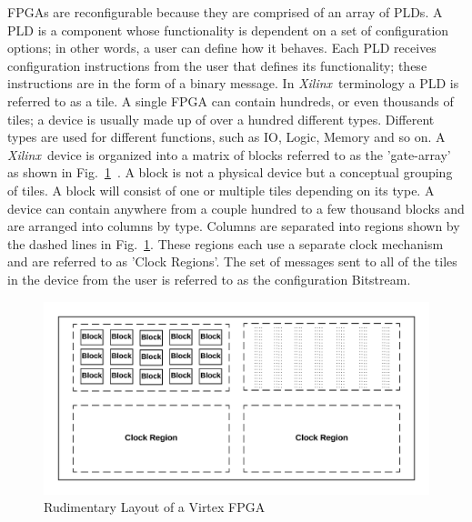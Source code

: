 \documentclass[conference]{IEEEtran}
\newcommand{\Xilinx}{\textit{\gls{Xilinx}}~}
\begin{document}
\acrshort{FPGA}s are reconfigurable because they are comprised of an array of \acrfull{PLDs}.
A \acrshort{PLD} is a component whose functionality is dependent on a set of configuration options; in other words, a user can define how it behaves.
Each \acrshort{PLD} receives configuration instructions from the user that defines its functionality; these instructions are in the form of a binary message.
In \Xilinx terminology a \acrshort{PLD} is referred to as a tile. 
A single \acrshort{FPGA} can contain hundreds, or even thousands of tiles; a device is usually made up of over a hundred different types.
Different types are used for different functions, such as \acrfull{IO}, Logic, Memory and so on.
A \Xilinx device is organized into a matrix of blocks referred to as the 'gate-array' as shown in Fig.~\ref{fig:FPGA}~\cite{xilnxDevManual}.
A block is not a physical device but a conceptual grouping of tiles.
A block will consist of one or multiple tiles depending on its type.
A device can contain anywhere from a couple hundred to a few thousand blocks and are arranged into columns by type.
Columns are separated into regions shown by the dashed lines in Fig.~\ref{fig:FPGA}.
These regions each use a separate clock mechanism and are referred to as 'Clock Regions'.
The set of messages sent to all of the tiles in the device from the user is referred to as the configuration \gls{Bitstream}.

\begin{figure}[h]
	\centering
	\includegraphics[width=1\linewidth]{Figures/FPGA}
	\caption[Rudimentary Layout of a Virtex \acrshort{FPGA}]{Rudimentary Layout of a Virtex \acrshort{FPGA}}
	\label{fig:FPGA}
\end{figure}
\end{document}
